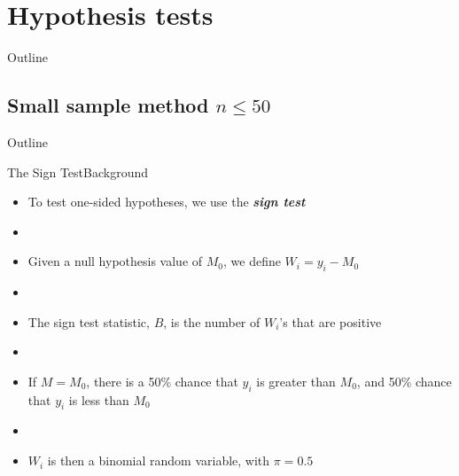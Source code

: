 \documentclass[xcolor=dvipsnames]{beamer}
\begin{document}
\section{Hypothesis tests}
\begin{frame}{Outline}
\tableofcontents[currentsection,subsectionstyle=show/shaded/hide]
\end{frame}

\subsection{Small sample method $n \leq 50$}
\begin{frame}{Outline}
\tableofcontents[currentsection,subsectionstyle=show/shaded/hide]
\end{frame}

\begin{frame}{The Sign Test}{Background}
	\begin{itemize}
		\item To test one-sided hypotheses, we use the \textbf{\emph{sign test}}
		\item[]
		\item Given a null hypothesis value of $M_0$, we define $W_i = y_i - M_0$
		\item[]
		\item The sign test statistic, $B$, is the number of $W_i$'s that are positive
		\item[]
		\item If $M = M_0$, there is a 50\% chance that $y_i$ is greater than $M_0$, and 50\% chance that $y_i$ is less than $M_0$
		\item[]
		\item $W_i$ is then a binomial random variable, with $\pi = 0.5$
	\end{itemize}
\end{frame}
\end{document}
